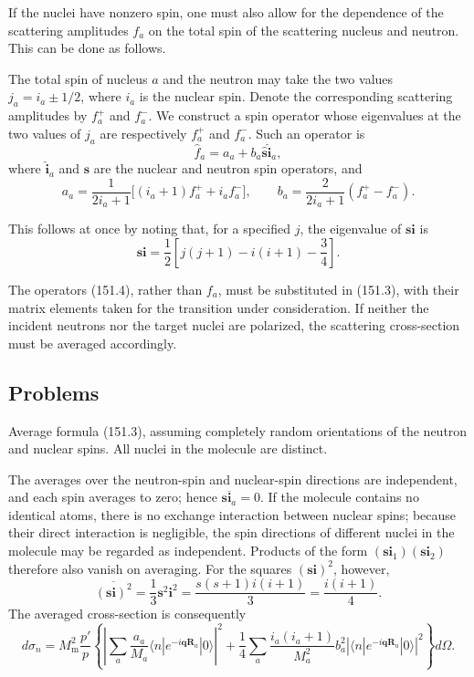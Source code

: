 If the nuclei have nonzero spin, one must also allow for the dependence of the scattering amplitudes $f_a$ on the total spin of the scattering nucleus and neutron. This can be done as follows.

The total spin of nucleus $a$ and the neutron may take the two values $j_a=i_a\pm1/2$, where $i_a$ is the nuclear spin. Denote the corresponding scattering amplitudes by $f_a^+$ and $f_a^-$. We construct a spin operator whose eigenvalues at the two values of $j_a$ are respectively $f_a^+$ and $f_a^-$. Such an operator is
\begin{equation}
 \hat f_a=a_a+b_a\hat{\mathbf s}\hat{\mathbf i}_a,
 \tag{151.4}
\end{equation}
where $\hat{\mathbf i}_a$ and $\hat{\mathbf s}$ are the nuclear and neutron spin operators, and
\begin{equation}
 a_a=\frac1{2i_a+1}\big[(i_a+1)f_a^++i_af_a^-\big],\qquad
 b_a=\frac2{2i_a+1}(f_a^+-f_a^-).
 \tag{151.5}
\end{equation}

This follows at once by noting that, for a specified $j$, the eigenvalue of $\mathbf s\mathbf i$ is
\[
 \mathbf s\mathbf i=\frac12\left[j(j+1)-i(i+1)-\frac34\right].
\]

The operators (151.4), rather than $f_a$, must be substituted in (151.3), with their matrix elements taken for the transition under consideration. If neither the incident neutrons nor the target nuclei are polarized, the scattering cross-section must be averaged accordingly.

\subsection*{Problems}

 Average formula (151.3), assuming completely random orientations of the neutron and nuclear spins. All nuclei in the molecule are distinct.

\SolutionHeading The averages over the neutron-spin and nuclear-spin directions are independent, and each spin averages to zero; hence $\overline{\mathbf s\mathbf i_a}=0$. If the molecule contains no identical atoms, there is no exchange interaction between nuclear spins; because their direct interaction is negligible, the spin directions of different nuclei in the molecule may be regarded as independent. Products of the form $(\mathbf s\mathbf i_1)(\mathbf s\mathbf i_2)$ therefore also vanish on averaging. For the squares $(\mathbf s\mathbf i)^2$, however,
\[
 \overline{(\mathbf s\mathbf i)^2}=\frac13\mathbf s^2\mathbf i^2
 =\frac{s(s+1)i(i+1)}3=\frac{i(i+1)}4.
\]
The averaged cross-section is consequently
\[
 d\sigma_n=M_\text{m}^2\frac{p'}p\left\{
 \left|\sum_a\frac{a_a}{M_a}\langle n|e^{-i\mathbf q\mathbf R_a}|0\rangle\right|^2
 +\frac14\sum_a\frac{i_a(i_a+1)}{M_a^2}b_a^2
 \left|\langle n|e^{-i\mathbf q\mathbf R_a}|0\rangle\right|^2\right\}d\Omega.
\]

